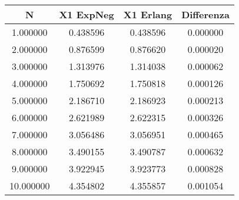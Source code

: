 \begin{tabular}{|c|c|c|c|}
\hline
\textbf{N}&\textbf{X1 ExpNeg}&\textbf{X1 Erlang}&\textbf{Differenza}\\\hline
1.000000&0.438596&0.438596&0.000000\\\hline
2.000000&0.876599&0.876620&0.000020\\\hline
3.000000&1.313976&1.314038&0.000062\\\hline
4.000000&1.750692&1.750818&0.000126\\\hline
5.000000&2.186710&2.186923&0.000213\\\hline
6.000000&2.621989&2.622315&0.000326\\\hline
7.000000&3.056486&3.056951&0.000465\\\hline
8.000000&3.490155&3.490787&0.000632\\\hline
9.000000&3.922945&3.923773&0.000828\\\hline
10.000000&4.354802&4.355857&0.001054\\\hline
\end{tabular}
